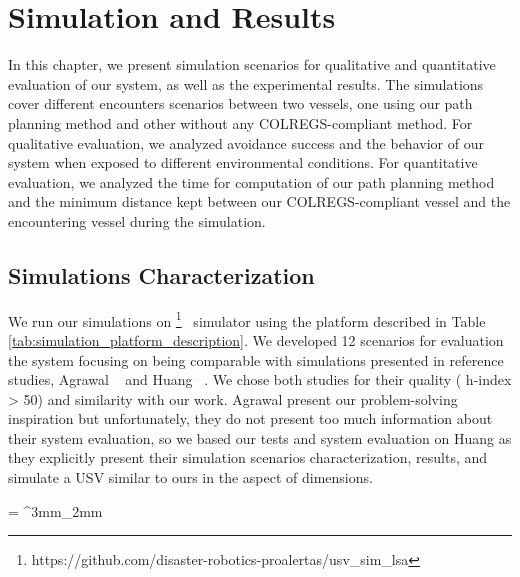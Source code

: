 \chapter{Simulation and Results}
\label{chap:5_Simulation_And_Results}
        
    In this chapter, we present simulation scenarios for qualitative and quantitative evaluation of our system, as well as the experimental results. The simulations cover different encounters scenarios between two vessels, one using our path planning method and other without any COLREGS-compliant method. For qualitative evaluation, we analyzed avoidance success and the behavior of our system when exposed to different environmental conditions. For quantitative evaluation, we analyzed the time for computation of our path planning method and the minimum distance kept between our COLREGS-compliant vessel and the encountering vessel during the simulation.

    \section{Simulations Characterization}

    We run our simulations on \usvsim\footnote{https://github.com/disaster-robotics-proalertas/usv\_sim\_lsa}~\cite{Paravisi2018Toward} simulator using the platform described in Table \ref{tab:simulation_platform_description}. 
    We developed 12 scenarios for evaluation the system focusing on being comparable with simulations presented in reference studies, \ie{} Agrawal \etal{} ~\cite{Agrawal2015COLREGS} and Huang \etal{} ~\cite{Huang2019Generalized}. We chose both studies for their quality (\ie{} h-index > 50) and similarity with our work. Agrawal \etal{} present our problem-solving inspiration but unfortunately, they do not present too much information about their system evaluation, so we based our tests and system evaluation on Huang \etal{} as they explicitly present their simulation scenarios characterization, results, and simulate a \ac{USV} similar to ours in the aspect of dimensions.
    
    \tabulinesep = ^3mm_2mm
    \everyrow{\tabucline[.4mm  white]{}}

